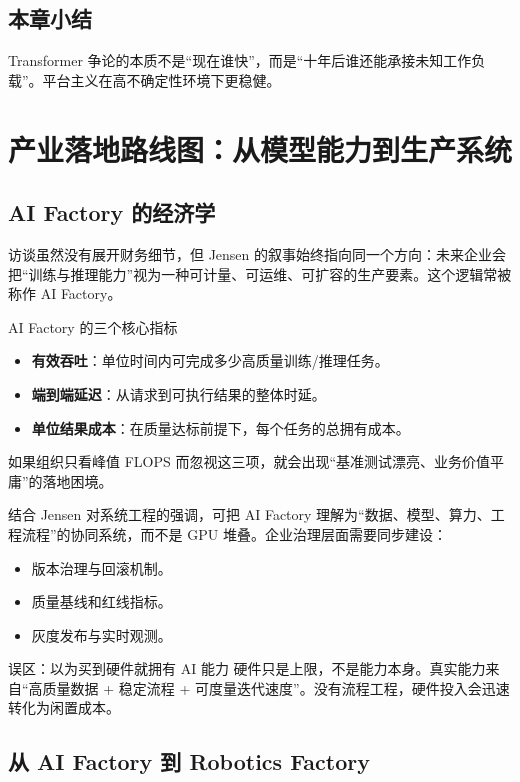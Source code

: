 \documentclass[a4paper]{article}
\begin{document}
\subsection{本章小结}
Transformer 争论的本质不是“现在谁快”，而是“十年后谁还能承接未知工作负载”。平台主义在高不确定性环境下更稳健。

\section{产业落地路线图：从模型能力到生产系统}

\subsection{AI Factory 的经济学}

访谈虽然没有展开财务细节，但 Jensen 的叙事始终指向同一个方向：未来企业会把“训练与推理能力”视为一种可计量、可运维、可扩容的生产要素。这个逻辑常被称作 AI Factory。

\begin{knowledgebox}{AI Factory 的三个核心指标}
\begin{itemize}
    \item \textbf{有效吞吐}：单位时间内可完成多少高质量训练/推理任务。
    \item \textbf{端到端延迟}：从请求到可执行结果的整体时延。
    \item \textbf{单位结果成本}：在质量达标前提下，每个任务的总拥有成本。
\end{itemize}
如果组织只看峰值 FLOPS 而忽视这三项，就会出现“基准测试漂亮、业务价值平庸”的落地困境。
\end{knowledgebox}

结合 Jensen 对系统工程的强调，可把 AI Factory 理解为“数据、模型、算力、工程流程”的协同系统，而不是 GPU 堆叠。企业治理层面需要同步建设：
\begin{itemize}
    \item 版本治理与回滚机制。
    \item 质量基线和红线指标。
    \item 灰度发布与实时观测。
\end{itemize}

\begin{warningbox}{误区：以为买到硬件就拥有 AI 能力}
硬件只是上限，不是能力本身。真实能力来自“高质量数据 + 稳定流程 + 可度量迭代速度”。没有流程工程，硬件投入会迅速转化为闲置成本。
\end{warningbox}

\subsection{从 AI Factory 到 Robotics Factory}
\end{document}
